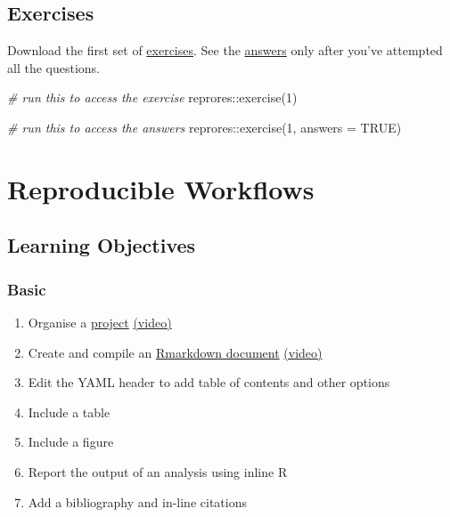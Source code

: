 \documentclass[
  oneside]{book}
\newenvironment{Shaded}{\begin{snugshade}}{\end{snugshade}}
\newcommand{\AttributeTok}[1]{\textcolor[rgb]{0.77,0.63,0.00}{#1}}
\newcommand{\CommentTok}[1]{\textcolor[rgb]{0.56,0.35,0.01}{\textit{#1}}}
\newcommand{\ConstantTok}[1]{\textcolor[rgb]{0.00,0.00,0.00}{#1}}
\newcommand{\DecValTok}[1]{\textcolor[rgb]{0.00,0.00,0.81}{#1}}
\newcommand{\FunctionTok}[1]{\textcolor[rgb]{0.00,0.00,0.00}{#1}}
\newcommand{\NormalTok}[1]{#1}
\newcommand{\SpecialCharTok}[1]{\textcolor[rgb]{0.00,0.00,0.00}{#1}}
\providecommand{\tightlist}{%
  \setlength{\itemsep}{0pt}\setlength{\parskip}{0pt}}
\begin{document}
\hypertarget{exercises-intro}{%
\section{Exercises}\label{exercises-intro}}

Download the first set of \href{exercises/01_intro_exercise.Rmd}{exercises}. See the \href{exercises/01_intro_answers.Rmd}{answers} only after you've attempted all the questions.

\begin{Shaded}
\begin{Highlighting}[]
\CommentTok{\# run this to access the exercise}
\NormalTok{reprores}\SpecialCharTok{::}\FunctionTok{exercise}\NormalTok{(}\DecValTok{1}\NormalTok{)}

\CommentTok{\# run this to access the answers}
\NormalTok{reprores}\SpecialCharTok{::}\FunctionTok{exercise}\NormalTok{(}\DecValTok{1}\NormalTok{, }\AttributeTok{answers =} \ConstantTok{TRUE}\NormalTok{)}
\end{Highlighting}
\end{Shaded}

\hypertarget{repro}{%
\chapter{Reproducible Workflows}\label{repro}}

\hypertarget{ilo-repro}{%
\section{Learning Objectives}\label{ilo-repro}}

\hypertarget{basic}{%
\subsection{Basic}\label{basic}}

\begin{enumerate}
\def\labelenumi{\arabic{enumi}.}
\tightlist
\item
  Organise a \protect\hyperlink{projects}{project} \href{https://youtu.be/y-KiPueC9xw}{(video)}
\item
  Create and compile an \protect\hyperlink{rmarkdown}{Rmarkdown document} \href{https://youtu.be/EqJiAlJAl8Y}{(video)}
\item
  Edit the YAML header to add table of contents and other options
\item
  Include a table
\item
  Include a figure
\item
  Report the output of an analysis using inline R
\item
  Add a bibliography and in-line citations
\end{enumerate}
\end{document}
